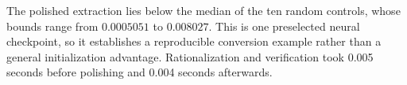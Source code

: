 The polished extraction lies below the median of the ten random controls, whose bounds range from $0.0005051$ to $0.008027$. This is one preselected neural checkpoint, so it establishes a reproducible conversion example rather than a general initialization advantage. Rationalization and verification took 0.005 seconds before polishing and 0.004 seconds afterwards.

